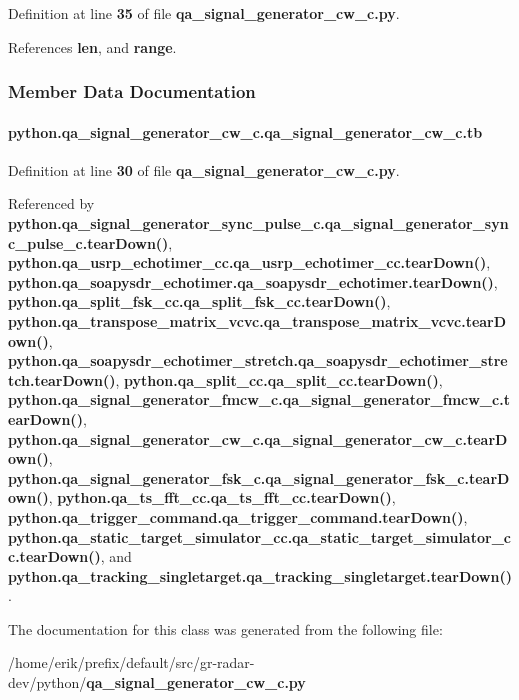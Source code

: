 Definition at line {\bf 35} of file {\bf qa\+\_\+signal\+\_\+generator\+\_\+cw\+\_\+c.\+py}.



References {\bf len}, and {\bf range}.



\subsubsection{Member Data Documentation}
\paragraph[{tb}]{\setlength{\rightskip}{0pt plus 5cm}python.\+qa\+\_\+signal\+\_\+generator\+\_\+cw\+\_\+c.\+qa\+\_\+signal\+\_\+generator\+\_\+cw\+\_\+c.\+tb}\label{classpython_1_1qa__signal__generator__cw__c_1_1qa__signal__generator__cw__c_ae8bb1be876f9682dc0f65d31fc6f0d28}


Definition at line {\bf 30} of file {\bf qa\+\_\+signal\+\_\+generator\+\_\+cw\+\_\+c.\+py}.



Referenced by {\bf python.\+qa\+\_\+signal\+\_\+generator\+\_\+sync\+\_\+pulse\+\_\+c.\+qa\+\_\+signal\+\_\+generator\+\_\+sync\+\_\+pulse\+\_\+c.\+tear\+Down()}, {\bf python.\+qa\+\_\+usrp\+\_\+echotimer\+\_\+cc.\+qa\+\_\+usrp\+\_\+echotimer\+\_\+cc.\+tear\+Down()}, {\bf python.\+qa\+\_\+soapysdr\+\_\+echotimer.\+qa\+\_\+soapysdr\+\_\+echotimer.\+tear\+Down()}, {\bf python.\+qa\+\_\+split\+\_\+fsk\+\_\+cc.\+qa\+\_\+split\+\_\+fsk\+\_\+cc.\+tear\+Down()}, {\bf python.\+qa\+\_\+transpose\+\_\+matrix\+\_\+vcvc.\+qa\+\_\+transpose\+\_\+matrix\+\_\+vcvc.\+tear\+Down()}, {\bf python.\+qa\+\_\+soapysdr\+\_\+echotimer\+\_\+stretch.\+qa\+\_\+soapysdr\+\_\+echotimer\+\_\+stretch.\+tear\+Down()}, {\bf python.\+qa\+\_\+split\+\_\+cc.\+qa\+\_\+split\+\_\+cc.\+tear\+Down()}, {\bf python.\+qa\+\_\+signal\+\_\+generator\+\_\+fmcw\+\_\+c.\+qa\+\_\+signal\+\_\+generator\+\_\+fmcw\+\_\+c.\+tear\+Down()}, {\bf python.\+qa\+\_\+signal\+\_\+generator\+\_\+cw\+\_\+c.\+qa\+\_\+signal\+\_\+generator\+\_\+cw\+\_\+c.\+tear\+Down()}, {\bf python.\+qa\+\_\+signal\+\_\+generator\+\_\+fsk\+\_\+c.\+qa\+\_\+signal\+\_\+generator\+\_\+fsk\+\_\+c.\+tear\+Down()}, {\bf python.\+qa\+\_\+ts\+\_\+fft\+\_\+cc.\+qa\+\_\+ts\+\_\+fft\+\_\+cc.\+tear\+Down()}, {\bf python.\+qa\+\_\+trigger\+\_\+command.\+qa\+\_\+trigger\+\_\+command.\+tear\+Down()}, {\bf python.\+qa\+\_\+static\+\_\+target\+\_\+simulator\+\_\+cc.\+qa\+\_\+static\+\_\+target\+\_\+simulator\+\_\+cc.\+tear\+Down()}, and {\bf python.\+qa\+\_\+tracking\+\_\+singletarget.\+qa\+\_\+tracking\+\_\+singletarget.\+tear\+Down()}.



The documentation for this class was generated from the following file\+:\begin{DoxyCompactItemize}
\item 
/home/erik/prefix/default/src/gr-\/radar-\/dev/python/{\bf qa\+\_\+signal\+\_\+generator\+\_\+cw\+\_\+c.\+py}\end{DoxyCompactItemize}
